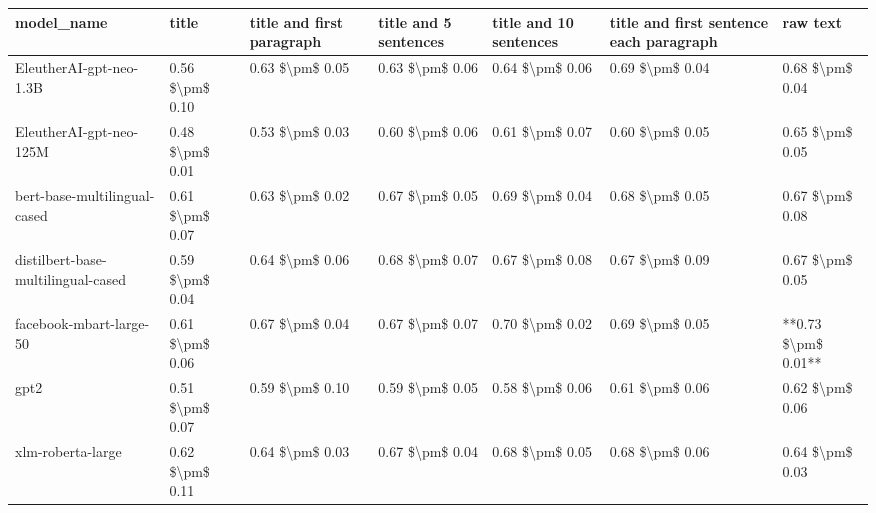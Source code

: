 \begin{tabular}{lllllll}
\toprule
                        model\_name &           title & title and first paragraph & title and 5 sentences & title and 10 sentences & title and first sentence each paragraph &            raw text \\
\midrule
           EleutherAI-gpt-neo-1.3B & 0.56 \$\textbackslash pm\$ 0.10 &           0.63 \$\textbackslash pm\$ 0.05 &       0.63 \$\textbackslash pm\$ 0.06 &        0.64 \$\textbackslash pm\$ 0.06 &                         0.69 \$\textbackslash pm\$ 0.04 &     0.68 \$\textbackslash pm\$ 0.04 \\
           EleutherAI-gpt-neo-125M & 0.48 \$\textbackslash pm\$ 0.01 &           0.53 \$\textbackslash pm\$ 0.03 &       0.60 \$\textbackslash pm\$ 0.06 &        0.61 \$\textbackslash pm\$ 0.07 &                         0.60 \$\textbackslash pm\$ 0.05 &     0.65 \$\textbackslash pm\$ 0.05 \\
      bert-base-multilingual-cased & 0.61 \$\textbackslash pm\$ 0.07 &           0.63 \$\textbackslash pm\$ 0.02 &       0.67 \$\textbackslash pm\$ 0.05 &        0.69 \$\textbackslash pm\$ 0.04 &                         0.68 \$\textbackslash pm\$ 0.05 &     0.67 \$\textbackslash pm\$ 0.08 \\
distilbert-base-multilingual-cased & 0.59 \$\textbackslash pm\$ 0.04 &           0.64 \$\textbackslash pm\$ 0.06 &       0.68 \$\textbackslash pm\$ 0.07 &        0.67 \$\textbackslash pm\$ 0.08 &                         0.67 \$\textbackslash pm\$ 0.09 &     0.67 \$\textbackslash pm\$ 0.05 \\
           facebook-mbart-large-50 & 0.61 \$\textbackslash pm\$ 0.06 &           0.67 \$\textbackslash pm\$ 0.04 &       0.67 \$\textbackslash pm\$ 0.07 &        0.70 \$\textbackslash pm\$ 0.02 &                         0.69 \$\textbackslash pm\$ 0.05 & **0.73 \$\textbackslash pm\$ 0.01** \\
                              gpt2 & 0.51 \$\textbackslash pm\$ 0.07 &           0.59 \$\textbackslash pm\$ 0.10 &       0.59 \$\textbackslash pm\$ 0.05 &        0.58 \$\textbackslash pm\$ 0.06 &                         0.61 \$\textbackslash pm\$ 0.06 &     0.62 \$\textbackslash pm\$ 0.06 \\
                 xlm-roberta-large & 0.62 \$\textbackslash pm\$ 0.11 &           0.64 \$\textbackslash pm\$ 0.03 &       0.67 \$\textbackslash pm\$ 0.04 &        0.68 \$\textbackslash pm\$ 0.05 &                         0.68 \$\textbackslash pm\$ 0.06 &     0.64 \$\textbackslash pm\$ 0.03 \\
\bottomrule
\end{tabular}
